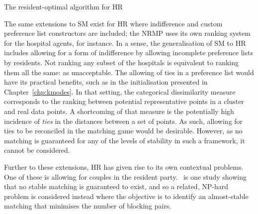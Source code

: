 \balg%
\caption{The resident-optimal algorithm for HR}\label{alg:hospital_resident}

\vspace{1em}


\ealg%

The same extensions to SM exist for HR where indifference and custom preference
list constructors are included; the NRMP uses its own ranking system for the
hospital agents, for instance. In a sense, the generalisation of SM to HR
includes allowing for a form of indifference by allowing incomplete preference
lists by residents. Not ranking any subset of the hospitals is equivalent to
ranking them all the same: as unacceptable. The allowing of ties in a preference
list would have its practical benefits, such as in the initialisation presented
in Chapter~\ref{chp:kmodes}. In that setting, the categorical dissimilarity
measure corresponds to the ranking between potential representative points in a
cluster and real data points. A shortcoming of that measure is the potentially
high incidence of \emph{ties} in the distances between a set of points. As such,
allowing for ties to be reconciled in the matching game would be desirable.
However, as no matching is guaranteed for any of the levels of stability in such
a framework, it cannot be considered.

Further to these extensions, HR has given rise to its own contextual problems.
One of these is allowing for couples in the resident party.~\cite{Manlove2016}
is one study showing that no stable matching is guaranteed to exist, and so a
related, NP-hard problem is considered instead where the objective is to
identify an almost-stable matching that minimises the number of blocking pairs.

